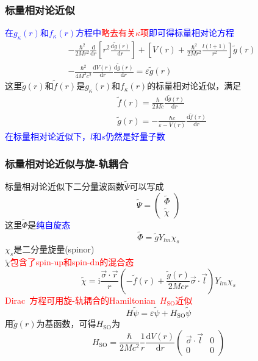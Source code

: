{\frame
{
	\frametitle{标量相对论近似}
	\textcolor{blue}{在$g_{\kappa}(r)$和$f_{\kappa}(r)$方程中}\textcolor{red}{略去有关$\kappa$项}\textcolor{blue}{即可得标量相对论方程}
	\begin{displaymath}
		\begin{aligned}
			&-\frac{\hbar^2}{2Mr^2}\frac{\mathrm{d}}{\mathrm{d}r}\left[ r^2\frac{\mathrm{d}\tilde{g}(r)}{\mathrm{d}r} \right]+\left[ V(r)+\frac{\hbar^2}{2Mr^2}\frac{l(l+1)}{r^2} \right]\tilde{g}(r)\\
			&-\frac{\hbar^2}{4M^2c^2}\frac{\mathrm{d}V(r)}{\mathrm{d}r}\frac{\mathrm{d}\tilde{g}(r)}{\mathrm{d}r}=\varepsilon\tilde{g}(r)
		\end{aligned}
	\end{displaymath}
	这里$\tilde g(r)$和$\tilde f(r)$是$g_{\kappa}(r)$和$f_{\kappa}(r)$的标量相对论近似，满足
	\begin{displaymath}
		\begin{aligned}
			&\tilde{f}(r)=\frac{\hbar}{2Mc}\frac{\mathrm{d}\tilde{g}(r)}{\mathrm{d}r}\\
			&\tilde{g}(r)=-\frac{\hbar c}{\varepsilon-V(r)}\frac{\mathrm{d}\tilde{f}(r)}{\mathrm{d}r}
		\end{aligned}
	\end{displaymath}
	\textcolor{blue}{在标量相对论近似下，$l$和$s$仍然是好量子数}
}

\frame
{
	\frametitle{标量相对论近似与旋-轨耦合}
	标量相对论近似下二分量波函数$\tilde\Psi$可以写成
	\begin{displaymath}
		\tilde\Psi=\left( 
		\begin{matrix}
			\tilde\Phi\\
			\tilde\chi
		\end{matrix}
		\right)
	\end{displaymath}
	这里$\tilde\Phi$是\textcolor{blue}{纯自旋态}$$\tilde\Phi=\tilde gY_{lm}\chi_s$$
	$\chi_s$是二分量旋量(\textrm{spinor})\\
	$\tilde\chi$\textcolor{red}{包含了\textrm{spin-up}和\textrm{spin-dn}的混合态}
	\begin{displaymath}
		\tilde\chi=\mathrm{i}\frac{\vec{\sigma}\cdot\vec r}r\left( -\tilde{f}(r)+\frac{\tilde{g}(r)}{2Mcr}\vec{\sigma}\cdot\vec l \right)Y_{lm}\chi_s
	\end{displaymath}
	\textcolor{red}{\textrm{Dirac~}方程可用旋-轨耦合的\textrm{Hamiltonian~}$H_{\mathrm{SO}}$近似}
	$$H\tilde{\psi}=\varepsilon\tilde{\psi}+H_{\mathrm{SO}}\tilde{\psi}$$
	用$\tilde{g}(r)$为基函数，可得$H_{\mathrm{SO}}$为
	\begin{displaymath}
		H_{\mathrm{SO}}=\frac{\hbar}{2Mc^2}\frac1r\frac{\mathrm{d}V(r)}{\mathrm{d}r}\left( 
		\begin{matrix}
			\vec{\sigma}\cdot\vec l &0\\
			0 &0
		\end{matrix}
		\right)
	\end{displaymath}
}

}
